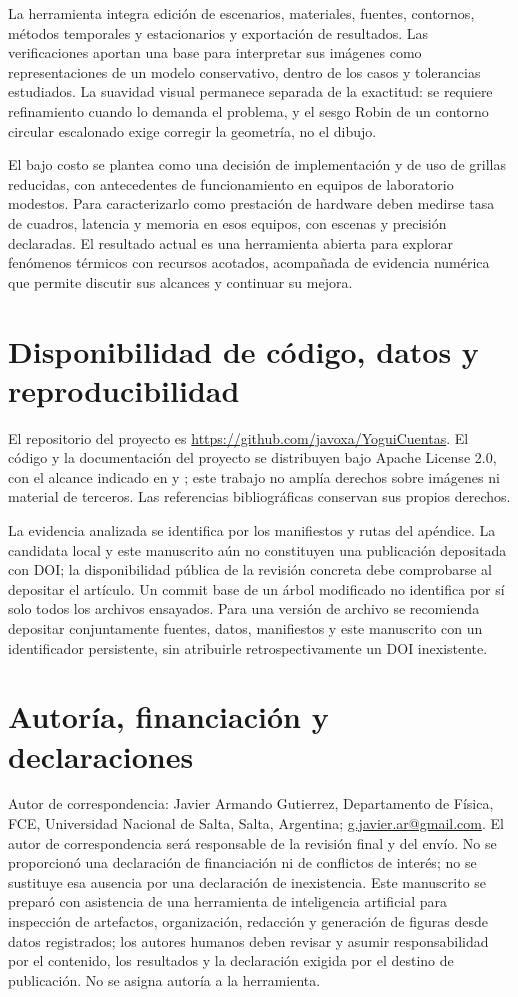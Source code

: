\documentclass[11pt,a4paper]{article}
\newcommand{\code}[1]{\texttt{\detokenize{#1}}}
\newcommand{\repo}{\url{https://github.com/javoxa/YoguiCuentas}}
\begin{document}
La herramienta integra edición de escenarios, materiales, fuentes, contornos, métodos temporales y estacionarios y exportación de resultados. Las verificaciones aportan una base para interpretar sus imágenes como representaciones de un modelo conservativo, dentro de los casos y tolerancias estudiados. La suavidad visual permanece separada de la exactitud: se requiere refinamiento cuando lo demanda el problema, y el sesgo Robin de un contorno circular escalonado exige corregir la geometría, no el dibujo.

El bajo costo se plantea como una decisión de implementación y de uso de grillas reducidas, con antecedentes de funcionamiento en equipos de laboratorio modestos. Para caracterizarlo como prestación de hardware deben medirse tasa de cuadros, latencia y memoria en esos equipos, con escenas y precisión declaradas. El resultado actual es una herramienta abierta para explorar fenómenos térmicos con recursos acotados, acompañada de evidencia numérica que permite discutir sus alcances y continuar su mejora.

\section*{Disponibilidad de código, datos y reproducibilidad}
El repositorio del proyecto es \repo. El código y la documentación del proyecto se distribuyen bajo Apache License 2.0, con el alcance indicado en \code{LICENSE} y \code{NOTICE}; este trabajo no amplía derechos sobre imágenes ni material de terceros. Las referencias bibliográficas conservan sus propios derechos.

La evidencia analizada se identifica por los manifiestos y rutas del apéndice. La candidata local y este manuscrito aún no constituyen una publicación depositada con DOI; la disponibilidad pública de la revisión concreta debe comprobarse al depositar el artículo. Un commit base de un árbol modificado no identifica por sí solo todos los archivos ensayados. Para una versión de archivo se recomienda depositar conjuntamente fuentes, datos, manifiestos y este manuscrito con un identificador persistente, sin atribuirle retrospectivamente un DOI inexistente.

\section*{Autoría, financiación y declaraciones}
Autor de correspondencia: Javier Armando Gutierrez, Departamento de Física, FCE, Universidad Nacional de Salta, Salta, Argentina; \href{mailto:g.javier.ar@gmail.com}{g.javier.ar@gmail.com}. El autor de correspondencia será responsable de la revisión final y del envío. No se proporcionó una declaración de financiación ni de conflictos de interés; no se sustituye esa ausencia por una declaración de inexistencia. Este manuscrito se preparó con asistencia de una herramienta de inteligencia artificial para inspección de artefactos, organización, redacción y generación de figuras desde datos registrados; los autores humanos deben revisar y asumir responsabilidad por el contenido, los resultados y la declaración exigida por el destino de publicación. No se asigna autoría a la herramienta.
\end{document}

